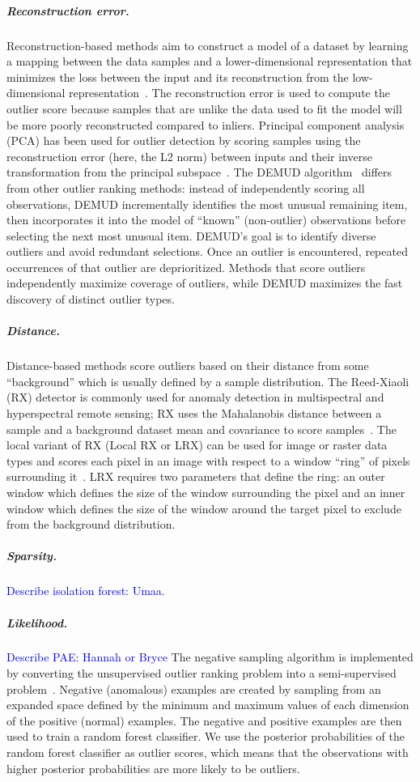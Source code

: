 \documentclass[letterpaper]{article} %
\newcommand{\todo}[1]{\textcolor{blue}{#1}}
\begin{document}
\subparagraph{Reconstruction error.}
Reconstruction-based methods aim to construct a model of a dataset by learning 
a mapping between the data samples and a lower-dimensional representation that
 minimizes the loss between the input and its reconstruction from the 
 low-dimensional representation~\citep{kerner2020comparison}. The 
 reconstruction error is used to compute the outlier score because samples
  that are unlike the data used to fit the model will be more poorly 
  reconstructed compared to inliers. 
Principal component analysis (PCA) has been used for outlier detection by
scoring samples using the reconstruction error (here, the L2 norm)
between inputs and their inverse
 transformation from the principal subspace~\citep{kerner2020comparison}.
The DEMUD algorithm~\citep{wagstaff:demud13} differs from other
outlier ranking methods: instead of independently scoring all
observations, DEMUD incrementally identifies the most unusual
remaining item, then incorporates it into the model of ``known''
(non-outlier) observations before selecting the next most unusual
item.  DEMUD's goal is to identify diverse outliers and avoid
redundant selections.  Once an outlier is encountered, repeated
occurrences of that outlier are deprioritized.  Methods that score
outliers independently maximize coverage of outliers, while DEMUD
maximizes the fast discovery of distinct outlier types.

\subparagraph{Distance.}
Distance-based methods score outliers based on their distance from some
``background'' which is usually defined by a sample distribution. The 
Reed-Xiaoli (RX) detector is commonly used for anomaly detection in
multispectral and hyperspectral remote sensing; RX uses the Mahalanobis
 distance between a sample and a background dataset mean and covariance
 to score samples~\citep{reed1990adaptive}. The local variant of RX (Local
 RX or LRX) can be used for image or raster data types and scores each pixel in
  an image with respect to a window ``ring'' of pixels surrounding 
  it~\citep{molero2013analysis}. 
  LRX requires two parameters that define the ring: an outer window which 
  defines the size of the window surrounding the pixel and an inner window
   which defines the size of the window around the target pixel to exclude from
   the background distribution. 

\subparagraph{Sparsity.}
\todo{Describe isolation forest: Umaa.}

\subparagraph{Likelihood.}
\todo{Describe PAE: Hannah or Bryce}
The negative sampling algorithm is implemented by converting the unsupervised 
outlier ranking problem into a semi-supervised 
problem~\citep{sipple:neg-sampling20}. Negative (anomalous) 
examples are created by sampling from an expanded space defined by the minimum 
and maximum values of each dimension of the positive (normal) examples. The 
negative and positive examples are then used to train a random forest 
classifier. We use the posterior probabilities of the random forest classifier 
as outlier scores, which means that the observations with higher posterior 
probabilities are more likely to be outliers.
\end{document}
